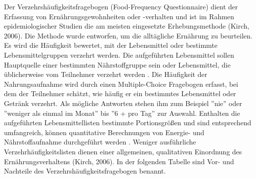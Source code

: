 Der Verzehrshäufigkeitsfragebogen (Food-Frequency Questionnaire) dient der Erfassung von Ernährungsgewohnheiten oder -verhalten und ist im Rahmen epidemiologischer Studien die am meisten eingesetzte Erhebungsmethode (Kirch, 2006). 
Die Methode wurde entworfen, um die alltägliche Ernährung zu beurteilen. Es wird die Häufigkeit bewertet, mit der Lebensmittel oder bestimmte Lebensmittelgruppen verzehrt werden. Die aufgeführten Lebensmittel sollen Hauptquelle einer bestimmten Nährstoffgruppe sein oder Lebensmittel, die üblicherweise vom Teilnehmer verzehrt werden . Die Häufigkeit der Nahrungsaufnahme wird durch einen Multiple-Choice Fragebogen erfasst, bei dem der Teilnehmer schätzt, wie häufig er ein bestimmtes Lebensmittel oder Getränk verzehrt. Als mögliche Antworten stehen ihm zum Beispiel ''nie'' oder ''weniger als einmal im Monat'' bis ''6 + pro Tag'' zur Auswahl. Enthalten die aufgeführten Lebensmittellisten  bestimmte Portionsgrößen und sind entsprechend umfangreich, können quantitative Berechnungen von Energie- und Nährstoffaufnahme durchgeführt werden . Weniger ausführliche Verzehrhäufigkeitslisten dienen einer allgemeinen, qualitativen Einordnung des Ernährungsverhaltens (Kirch, 2006). 
In der folgenden Tabelle sind Vor- und Nachteile des Verzehrshäufigkeitsfragebogen benannt.




